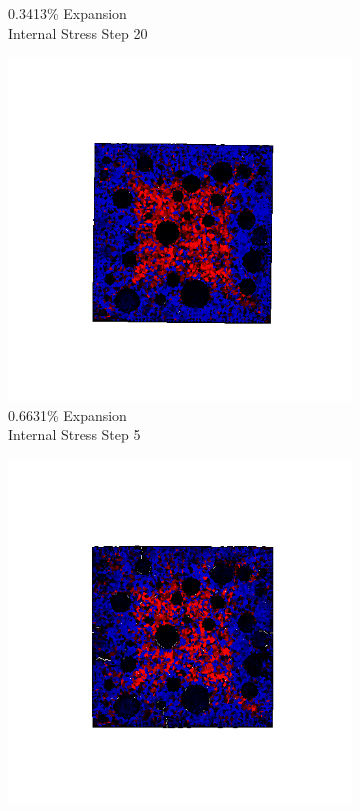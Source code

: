 \begin{figure}[ht!]
\begin{subfigure}{.25\textwidth}
      \caption{0.3413\% Expansion\\Internal Stress Step 20}
    \end{subfigure}
    \begin{subfigure}{.25\textwidth}
      \centering
      \includegraphics[width=1.0\linewidth]{Files/exp_3D/DEF/A15X0C_3_s5.png}
      \caption{0.6631\% Expansion\\Internal Stress Step 5}
    \end{subfigure}%
    \begin{subfigure}{.25\textwidth}
      \centering
      \includegraphics[width=1.0\linewidth]{Files/exp_3D/DEF/A15X0C_3_s10.png}

\end{subfigure}
\end{figure}
